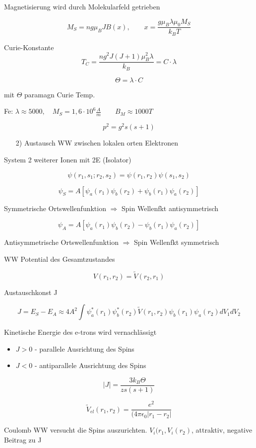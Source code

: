 Magnetisierung wird durch Molekularfeld getrieben

\[M_S = ng\mu_B J B(x),\qquad x = \frac{g\mu_B \lambda\mu_0 M_S}{k_B T}\]

Curie-Konstante
\[T_C = \frac{n g^2 J(J+1)\mu_B^2 \lambda}{k_B} = C\cdot\lambda\]

\[\Theta =\lambda\cdot C\]

mit \(\Theta\) paramagn Curie Temp.

Fe: \(\lambda\approx 5000,\quad M_S = 1,6\cdot 10^{6}\frac{A}{m}\qquad B_M \approx 1000T\)

\[p^2 = g^2 s(s+1)\]

\begin{itemize}
\item[2)] Austausch WW zwischen lokalen orten Elektronen
\end{itemize}

System 2 weiterer Ionen mit 2E (Isolator)

\[\psi(r_1,s_1;r_2,s_2) = \psi(r_1,r_2)\psi(s_1,s_2)\]

\[\psi_S = A[\psi_a(r_1) \psi_b(r_2)+\psi_b(r_1)\psi_a(r_2)  ]\]

Symmetrische Ortswellenfunktion \(\Rightarrow \) Spin Wellenfkt antisymmetrisch

\[\psi_A = A[\psi_a(r_1) \psi_b(r_2)-\psi_b(r_1)\psi_a(r_2)  ]\]

Antisymmetrische Ortswellenfunktion \(\Rightarrow \) Spin Wellenfkt symmetrisch

WW Potential des Gesamtzustandes

\[V(r_1,r_2) = \tilde V(r_2,r_1)\]

Austauschkonst J

\[ J = E_S - E_A \approx 4 A^2 \int \psi_a^*(r_1)\psi_b^*(r_2)\tilde V(r_1,r_2)\psi_b(r_1)\psi_a(r_2)dV_1dV_2\]

Kinetische Energie des e-trons wird vernachlässigt

\begin{itemize}
\item \(J>0\) - parallele Ausrichtung des Spins
\item \(J<0\) - antiparallele Ausrichtung des Spins
\end{itemize}

\[|J| = \frac{3k_B \Theta}{z s(s+1)}\]


\[\tilde V_{el}(r_1,r_2) = \frac{e^2}{(4\pi \epsilon_0|r_1-r_2|}\]

Coulomb WW versucht die Spins auszurichten. \(V_i(r_1,V_i(r_2)\), attraktiv, negative Beitrag zu J

